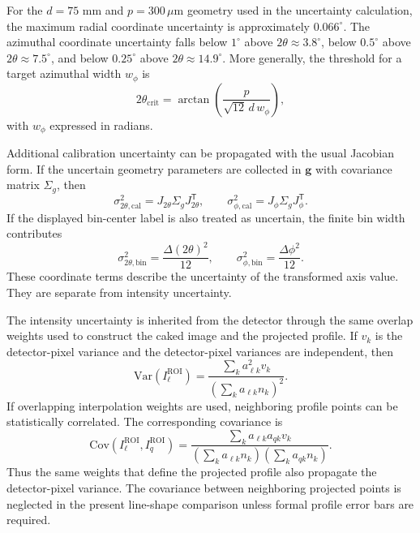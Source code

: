 \documentclass[11pt]{article}
\begin{document}
For the $d=75$ mm and $p=300\,\mu\mathrm{m}$ geometry used in the uncertainty calculation, the maximum radial coordinate uncertainty is approximately $0.066^{\circ}$. The azimuthal coordinate uncertainty falls below $1^{\circ}$ above $2\theta\approx3.8^{\circ}$, below $0.5^{\circ}$ above $2\theta\approx7.5^{\circ}$, and below $0.25^{\circ}$ above $2\theta\approx14.9^{\circ}$. More generally, the threshold for a target azimuthal width $w_{\phi}$ is
\begin{equation}
2\theta_{\mathrm{crit}}=\arctan\!\left(\frac{p}{\sqrt{12}\,d\,w_{\phi}}\right),
\end{equation}
with $w_{\phi}$ expressed in radians.

Additional calibration uncertainty can be propagated with the usual Jacobian form. If the uncertain geometry parameters are collected in $\mathbf g$ with covariance matrix $\Sigma_g$, then
\begin{equation}
\sigma^2_{2\theta,\mathrm{cal}}=
J_{2\theta}\Sigma_gJ_{2\theta}^{\mathsf T},
\qquad
\sigma^2_{\phi,\mathrm{cal}}=
J_{\phi}\Sigma_gJ_{\phi}^{\mathsf T}.
\end{equation}
If the displayed bin-center label is also treated as uncertain, the finite bin width contributes
\begin{equation}
\sigma^2_{2\theta,\mathrm{bin}}=\frac{\Delta(2\theta)^2}{12},
\qquad
\sigma^2_{\phi,\mathrm{bin}}=\frac{\Delta\phi^2}{12}.
\end{equation}
These coordinate terms describe the uncertainty of the transformed axis value. They are separate from intensity uncertainty.

The intensity uncertainty is inherited from the detector through the same overlap weights used to construct the caked image and the projected profile. If $v_k$ is the detector-pixel variance and the detector-pixel variances are independent, then
\begin{equation}
\mathrm{Var}\!\left(I_{\ell}^{\mathrm{ROI}}\right)=
\frac{\sum_k a_{\ell k}^{2}v_k}
     {\left(\sum_k a_{\ell k}n_k\right)^2}.
\end{equation}
If overlapping interpolation weights are used, neighboring profile points can be statistically correlated. The corresponding covariance is
\begin{equation}
\mathrm{Cov}\!\left(I_{\ell}^{\mathrm{ROI}},I_{q}^{\mathrm{ROI}}\right)=
\frac{\sum_k a_{\ell k}a_{qk}v_k}
     {\left(\sum_k a_{\ell k}n_k\right)
      \left(\sum_k a_{qk}n_k\right)}.
\end{equation}
Thus the same weights that define the projected profile also propagate the detector-pixel variance. The covariance between neighboring projected points is neglected in the present line-shape comparison unless formal profile error bars are required.
\end{document}
